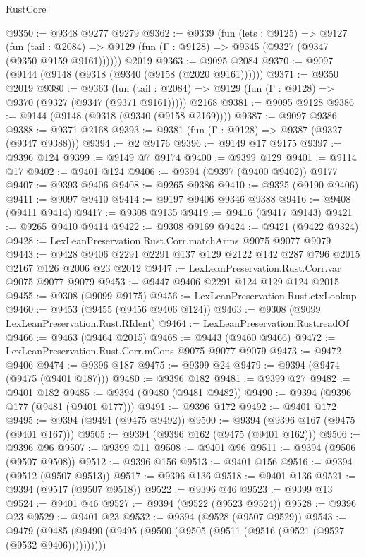 \begin{lexlean}{RustCore}
\begin{coremodule}
@9350 := @9348 @9277 @9279
@9362 := @9339
    (fun (lets : @9125) =>
    @9127
      (fun (tail : @2084) => @9129 (fun (Γ : @9128) => @9345 (@9327 (@9347 (@9350 @9159 @9161))))))
    @2019
@9363 := @9095 @2084
@9370 := @9097 (@9144 (@9148 (@9318 (@9340 (@9158 (@2020 @9161))))))
@9371 := @9350 @2019
@9380 := @9363
    (fun (tail : @2084) => @9129 (fun (Γ : @9128) => @9370 (@9327 (@9347 (@9371 @9161)))))
    @2168
@9381 := @9095 @9128
@9386 := @9144 (@9148 (@9318 (@9340 (@9158 @2169))))
@9387 := @9097 @9386
@9388 := @9371 @2168
@9393 := @9381 (fun (Γ : @9128) => @9387 (@9327 (@9347 @9388)))
@9394 := @2 @9176
@9396 := @9149 @17 @9175
@9397 := @9396 @124
@9399 := @9149 @7 @9174
@9400 := @9399 @129
@9401 := @9114 @17
@9402 := @9401 @124
@9406 := @9394 (@9397 (@9400 @9402)) @9177
@9407 := @9393 @9406
@9408 := @9265 @9386
@9410 := @9325 (@9190 @9406)
@9411 := @9097 @9410
@9414 := @9197 @9406 @9346 @9388
@9416 := @9408 (@9411 @9414)
@9417 := @9308 @9135
@9419 := @9416 (@9417 @9143)
@9421 := @9265 @9410 @9414
@9422 := @9308 @9169
@9424 := @9421 (@9422 @9324)
@9428 := LexLeanPreservation.Rust.Corr.matchArms @9075 @9077 @9079
@9443 := @9428 @9406 @2291 @2291 @137 @129 @2122 @142 @287 @796 @2015 @2167 @126 @2006 @23 @2012
@9447 := LexLeanPreservation.Rust.Corr.var @9075 @9077 @9079
@9453 := @9447 @9406 @2291 @124 @129 @124 @2015
@9455 := @9308 (@9099 @9175)
@9456 := LexLeanPreservation.Rust.ctxLookup
@9460 := @9453 (@9455 (@9456 @9406 @124))
@9463 := @9308 (@9099 LexLeanPreservation.Rust.RIdent)
@9464 := LexLeanPreservation.Rust.readOf
@9466 := @9463 (@9464 @2015)
@9468 := @9443 (@9460 @9466)
@9472 := LexLeanPreservation.Rust.Corr.mCons @9075 @9077 @9079
@9473 := @9472 @9406
@9474 := @9396 @187
@9475 := @9399 @24
@9479 := @9394 (@9474 (@9475 (@9401 @187)))
@9480 := @9396 @182
@9481 := @9399 @27
@9482 := @9401 @182
@9485 := @9394 (@9480 (@9481 @9482))
@9490 := @9394 (@9396 @177 (@9481 (@9401 @177)))
@9491 := @9396 @172
@9492 := @9401 @172
@9495 := @9394 (@9491 (@9475 @9492))
@9500 := @9394 (@9396 @167 (@9475 (@9401 @167)))
@9505 := @9394 (@9396 @162 (@9475 (@9401 @162)))
@9506 := @9396 @96
@9507 := @9399 @11
@9508 := @9401 @96
@9511 := @9394 (@9506 (@9507 @9508))
@9512 := @9396 @156
@9513 := @9401 @156
@9516 := @9394 (@9512 (@9507 @9513))
@9517 := @9396 @136
@9518 := @9401 @136
@9521 := @9394 (@9517 (@9507 @9518))
@9522 := @9396 @46
@9523 := @9399 @13
@9524 := @9401 @46
@9527 := @9394 (@9522 (@9523 @9524))
@9528 := @9396 @23
@9529 := @9401 @23
@9532 := @9394 (@9528 (@9507 @9529))
@9543 := @9479 (@9485 (@9490 (@9495 (@9500 (@9505 (@9511 (@9516 (@9521 (@9527 (@9532 @9406))))))))))

\end{coremodule}
\end{lexlean}
